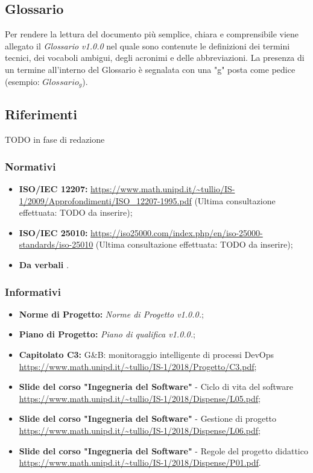 \subsection{Glossario}
Per rendere la lettura del documento più semplice, chiara e comprensibile viene allegato il \emph{Glossario v1.0.0} nel quale sono contenute le definizioni dei termini tecnici, dei vocaboli ambigui, degli acronimi e delle abbreviazioni. La presenza di un termine all'interno del Glossario è segnalata con una "g" posta come pedice (esempio: $Glossario_{g}$).

\subsection{Riferimenti}

TODO in fase di redazione

\subsubsection{Normativi}
\begin{itemize}
	\item \textbf{ISO/IEC 12207:} \url{https://www.math.unipd.it/~tullio/IS-1/2009/Approfondimenti/ISO_12207-1995.pdf} (Ultima consultazione effettuata: TODO da inserire);
	\item \textbf{ISO/IEC 25010:} \url{https://iso25000.com/index.php/en/iso-25000-standards/iso-25010} (Ultima consultazione effettuata: TODO da inserire);
	\item \textbf{Da verbali} \emph{.}
\end{itemize}
\subsubsection{Informativi}
\begin{itemize}
	\item \textbf{Norme di Progetto:} \emph{Norme di Progetto v1.0.0.};
	\item \textbf{Piano di Progetto:} \emph{Piano di qualifica v1.0.0.};
	\item \textbf{Capitolato C3:} G\&B: monitoraggio intelligente di processi DevOps
 \\ \url{https://www.math.unipd.it/~tullio/IS-1/2018/Progetto/C3.pdf};
 	\item \textbf{Slide del corso "Ingegneria del Software"} - Ciclo di vita del software
 \\ \url{https://www.math.unipd.it/~tullio/IS-1/2018/Dispense/L05.pdf};
	\item \textbf{Slide del corso "Ingegneria del Software"} - Gestione di progetto
 \\ \url{https://www.math.unipd.it/~tullio/IS-1/2018/Dispense/L06.pdf};
 	\item \textbf{Slide del corso "Ingegneria del Software"} - Regole del progetto didattico
 \\ \url{https://www.math.unipd.it/~tullio/IS-1/2018/Dispense/P01.pdf}.
 
\end{itemize}

